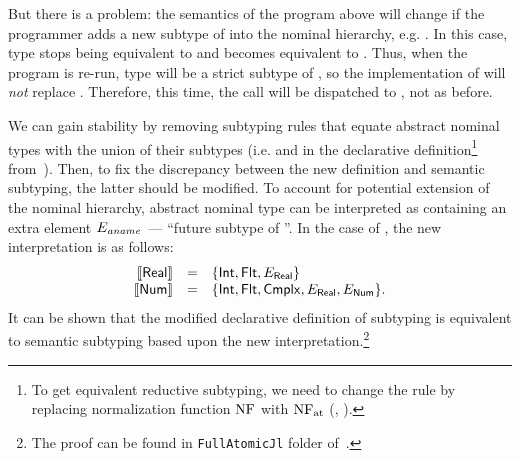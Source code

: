 But there is a problem: %
the semantics of the program above will change
if the programmer adds a new subtype of  
into the nominal hierarchy, e.g. .
In this case, type 
stops being equivalent to 
and becomes equivalent to .
Thus, when the program is re-run, type  
will be a strict subtype of ,
so the implementation of  will \emph{not} replace . 
Therefore, this time, the call  
will be dispatched to , not  as before.

We can gain stability by removing subtyping rules that 
equate abstract nominal types with the union of their subtypes
(i.e.  and  
in the declarative definition\footnote{To get 
	equivalent reductive subtyping, we need to change 
    the  rule by replacing normalization function $\mathop{\mathrm{NF}}$ with $\mathop{\mathrm{NF}_{\mathrm{at}}}$ 
    (, ).}
from~).
Then, to fix the discrepancy between the new definition 
and semantic subtyping, the latter should be modified. 
To account for potential extension of the nominal hierarchy,
abstract nominal type \aname can be interpreted 
as containing an extra element $E_\mathit{aname}$~--- ``future subtype of \aname''.
In the case of \BetaJulia, the new interpretation is as follows:
\[
\begin{array}{rcl}
\llbracket \mathsf{Real} \rrbracket & = & \{ \mathsf{Int}, \mathsf{Flt}, E_{\mathsf{Real}} \} \\
\llbracket \mathsf{Num} \rrbracket & = & \{ \mathsf{Int}, \mathsf{Flt}, \mathsf{Cmplx},
                           E_{\mathsf{Real}}, E_{\mathsf{Num}} \}.
\end{array}
\]
It can be shown that
the modified declarative definition of subtyping
is equivalent to semantic subtyping 
based upon the new interpretation.\footnote{The proof can be found 
	in \texttt{FullAtomicJl} folder of~\cite{bib:MiniJlCoq}.}
